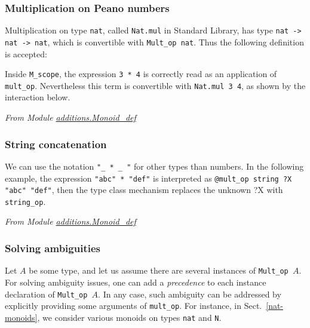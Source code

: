 \subsubsection{Multiplication on Peano numbers}

Multiplication  on type \texttt{nat}, called \texttt{Nat.mul} in
Standard Library, has  type \linebreak \texttt{nat -> nat -> nat}, which is
convertible  with \texttt{Mult\_op nat}. Thus the following definition is
accepted:


Inside \texttt{M\_scope}, the expression \texttt{3 * 4} is 
correctly read as an application of \texttt{mult\_op}. Nevertheless 
this term is convertible with \texttt{Nat.mul 3 4}, as shown by the 
interaction below.

\emph{From Module \href{../theories/html/additions.Monoid_def.html}{additions.Monoid\_def}}



\subsubsection{String concatenation}
We can use the notation \texttt{"\_ * \_ "} for other types than numbers.
In the following example,  the expression \texttt{"abc" * "def"} is interpreted
as \linebreak \texttt{@mult\_op string  {\color{darkred}?X} "abc"  "def"}, then the type  class mechanism replaces the unknown  {\color{darkred}?X} with 
\texttt{string\_op}.


\emph{From Module \href{../theories/html/additions.Monoid_def.html}{additions.Monoid\_def}}



\subsubsection{Solving ambiguities}
Let $A$ be some type, and let us assume there are several instances of
\texttt{Mult\_op $A$}. For solving ambiguity issues, one can
add a \emph{precedence} to each instance declaration of  
\texttt{Mult\_op $A$}. In any case, such ambiguity  can be addressed
by explicitly providing  some arguments of \texttt{mult\_op}.
For instance, in Sect.~\vref{nat-monoids}, we consider various monoids on types
\texttt{nat} and \texttt{N}. 


